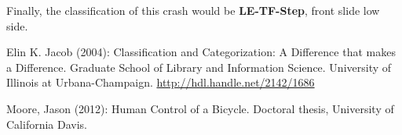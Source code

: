\documentclass{article}
\begin{document}
Finally, the classification of this crash would be \textbf{LE-TF-Step}, front slide low side.

\begin{thebibliography}{9}

     Elin K. Jacob (2004):  Classification and Categorization: A Difference that makes a Difference. Graduate School of Library and Information Science. University of Illinois at Urbana-Champaign. \url{http://hdl.handle.net/2142/1686}

     Moore, Jason (2012): Human Control of a Bicycle. Doctoral thesis, University of California Davis.


\end{thebibliography}
\end{document}
